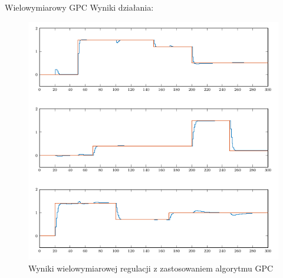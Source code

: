 \begin{frame}{Wielowymiarowy GPC}
Wyniki działania:
	\begin{center}
		\begin{figure}[H]
            		\includegraphics[scale=0.4]{images/innydmc.png} %
          			 \caption{Wyniki wielowymiarowej regulacji z zastosowaniem algorytmu GPC}
		\end{figure}
	\end{center}
\end{frame}
